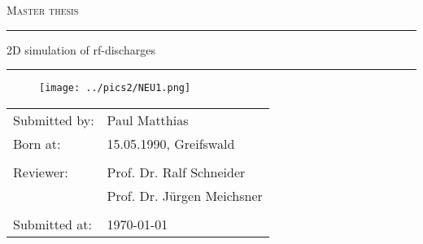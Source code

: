 
\thispagestyle{empty}
\begin{center}
\absatz
\textsc{\huge{Master thesis}}\\
\absatz
\hrule
\LARGE{2D simulation of rf-discharges}
\hrule
\absatz
\begin{figure}
[H]
\centering
\texttt{[image: ../pics2/NEU1.png]} 
\end{figure}

\end{center}
\absatz
\begin{table}
[H]
\begin{tabular}{ll}
Submitted by: & Paul Matthias \\
Born at: & 15.05.1990, Greifswald \\
 & \\
Reviewer: & Prof. Dr. Ralf Schneider \\
 & Prof. Dr. J\"urgen Meichsner \\
  & \\
Submitted at: & \today 
\end{tabular}
\end{table}

\newpage
\newpage 
\thispagestyle{empty}
\quad 
\newpage

\tableofcontents

\newpage 
\thispagestyle{empty}
\quad 
\newpage


